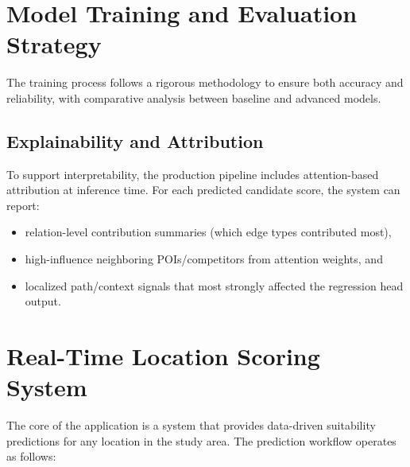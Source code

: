 \section{Model Training and Evaluation Strategy}

The training process follows a rigorous methodology to ensure both accuracy and reliability, with comparative analysis between baseline and advanced models.

\subsection{Explainability and Attribution}
To support interpretability, the production pipeline includes attention-based attribution at inference time. For each predicted candidate score, the system can report:
\begin{itemize}
		\item relation-level contribution summaries (which edge types contributed most),
		\item high-influence neighboring POIs/competitors from attention weights, and
		\item localized path/context signals that most strongly affected the regression head output.
\end{itemize}



\section{Real-Time Location Scoring System}

The core of the application is a system that provides data-driven suitability predictions for any location in the study area. The prediction workflow operates as follows:

